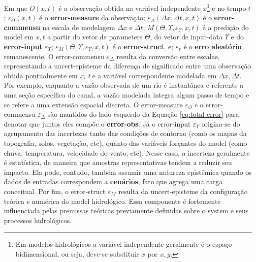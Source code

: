 \documentclass[./main.tex]{subfiles}
\begin{document}
Em que $O(x, t)$ é a observação obtida na variável independente $x$\footnote{Em modelos hidrológicos a variável independente geralmente é o espaço bidimensional, ou seja, deve-se substituir $x$ por $x, y$.} e no tempo $t$; $\varepsilon_{O}(x, t)$ é o \textbf{\gls{error-measure}} da observação; $\varepsilon_{\Delta}(\Delta x,\Delta t, x, t)$ é o\textbf{ \gls{error-commensu}} na escala de modelagem $\Delta x$ e $\Delta t$; $M(\Theta, \Upsilon, \varepsilon_{\Upsilon}, x, t)$ é a predição do \gls{model} em $x, t$ a partir do vetor de \gls{parameters} $\Theta$, do vetor de \gls{input-data} $\Upsilon$ e do \textbf{\gls{error-input}} $\varepsilon_{\Upsilon}$; $\varepsilon_{M}(\Theta, \Upsilon, \varepsilon_{\Upsilon}, x, t)$ é o \textbf{\gls{error-struct}}, e; $\varepsilon_r$ é o \textbf{erro aleatório} remanescente. O \gls{error-commensu} $\varepsilon_{\Delta}$ resulta da conversão entre escalas, representando a \gls{uncert-episteme} da diferença de significado entre uma observação obtida pontualmente em \textit{x, t} e a variável correspondente modelada em $\Delta x, \Delta t$. Por exemplo, enquanto a vazão observada de um rio é instantânea e referente a uma seção específica do canal, a vazão modelada integra algum passo de tempo e se refere a uma extensão espacial discreta. O \gls{error-measure} $\varepsilon_{O}$ e o \gls{error-commensu} $\varepsilon_{\Delta}$ são mantidos do lado esquerdo da Equação \eqref{eq:total-error} para denotar que juntos eles compõe o \textbf{\gls{error-obs}}. Já o \gls{error-input} $\varepsilon_\Upsilon$ origina-se do agrupamento das incertezas tanto das condições de contorno (como os mapas da topografia, solos, vegetação, etc), quanto das variáveis forçantes do \gls{model} (como chuva, temperatura, velocidade do vento, etc). Nesse caso, a incerteza geralmente é estatística, de maneira que amostras representativas tendem a reduzir seu impacto. Ela pode, contudo, também assumir uma natureza epistêmica quando os dados de entradas correspondem a \textbf{cenários}, fato que agrega uma carga conceitual. Por fim, o \gls{error-struct} $\varepsilon_M$ resulta da \gls{uncert-episteme} da configuração teórica e numérica do \gls{model} hidrológico. Essa componente é fortemente influenciada pelas premissas teóricas previamente definidas sobre o \gls{system} e seus processos hidrológicos.
\end{document}
